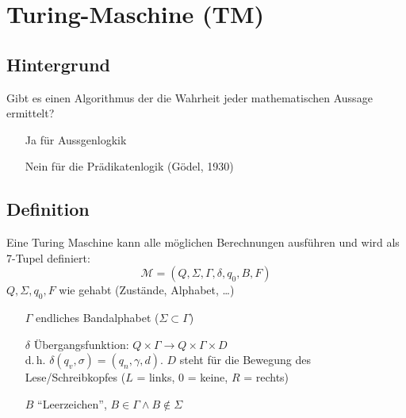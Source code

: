 \section{Turing-Maschine (TM)}
\subsection{Hintergrund}
Gibt es einen Algorithmus der die Wahrheit jeder mathematischen Aussage ermittelt?
\begin{itemize}\itemsep0em
	\item[Ja] für Aussgenlogkik 
	\item[Nein] für die Prädikatenlogik (Gödel, 1930)
\end{itemize}

\subsection{Definition}
Eine Turing Maschine kann alle möglichen Berechnungen ausführen und wird als 7-Tupel definiert:
\begin{equation*}
	\mathcal{M} = (Q, \Sigma, \Gamma, \delta, q_0, B, F)
\end{equation*}
$Q, \Sigma, q_0, F$ wie gehabt (Zustände, Alphabet, \dots)
\begin{itemize}\itemsep0em
	\item [$\Gamma$] endliches Bandalphabet ($\Sigma \subset \Gamma$)
	\item [$\delta$] Übergangsfunktion: $Q \times \Gamma \rightarrow Q \times \Gamma \times D$\\
	d.\,h. $\delta(q_v,\sigma) = (q_n, \gamma, d)$. $D$ steht für die Bewegung des Lese/Schreibkopfes ($L$ = links, $0$ = keine, $R$ = rechts)
	\item [$B$] \enquote{Leerzeichen}, $B \in \Gamma \wedge B \notin \Sigma$
\end{itemize}
